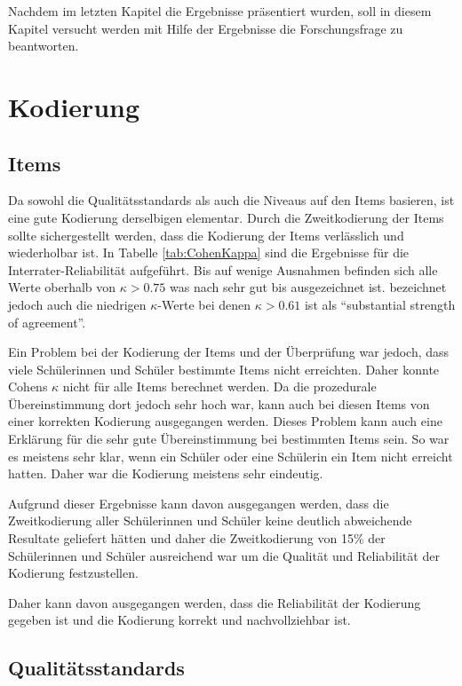 

Nachdem im letzten Kapitel die Ergebnisse präsentiert wurden, soll in diesem Kapitel versucht werden mit Hilfe der Ergebnisse die Forschungsfrage zu beantworten.

\section{Kodierung}

\subsection{Items}

Da sowohl die Qualitätsstandards als auch die Niveaus auf den Items basieren, ist eine gute Kodierung derselbigen elementar. Durch die Zweitkodierung der Items sollte sichergestellt werden, dass die Kodierung der Items verlässlich und wiederholbar ist. In Tabelle \ref{tab:CohenKappa} sind die Ergebnisse für die Interrater-Reliabilität aufgeführt. Bis auf wenige Ausnahmen befinden sich alle Werte oberhalb von $\kappa > 0.75$ was nach \citet[S.111]{Greve1997} sehr gut bis ausgezeichnet ist. \citet{Landis1977} bezeichnet jedoch auch die niedrigen $\kappa$-Werte bei denen $\kappa > 0.61$ ist als "`substantial strength of agreement"'. 

Ein Problem bei der Kodierung der Items und der Überprüfung war jedoch, dass viele Schülerinnen und Schüler bestimmte Items nicht erreichten. Daher konnte Cohens $\kappa$ nicht für alle Items berechnet werden. Da die prozedurale Übereinstimmung dort jedoch sehr hoch war, kann auch bei diesen Items von einer korrekten Kodierung ausgegangen werden. Dieses Problem kann auch eine Erklärung für die sehr gute Übereinstimmung bei bestimmten Items sein. So war es meistens sehr klar, wenn ein Schüler oder eine Schülerin ein Item nicht erreicht hatten. Daher war die Kodierung meistens sehr eindeutig.

Aufgrund dieser Ergebnisse kann davon ausgegangen werden, dass die Zweitkodierung aller Schülerinnen und Schüler keine deutlich abweichende Resultate geliefert hätten und daher die Zweitkodierung von 15\% der Schülerinnen und Schüler ausreichend war um die Qualität und Reliabilität der Kodierung festzustellen.

Daher kann davon ausgegangen werden, dass die Reliabilität der Kodierung gegeben ist und die Kodierung korrekt und nachvollziehbar ist.

\subsection{Qualitätsstandards}

